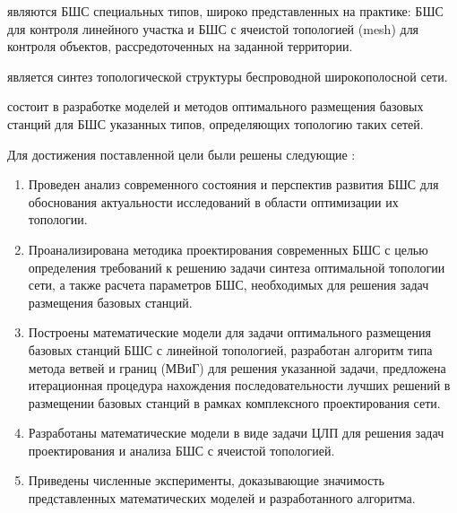 {\objectresearch} являются БШС специальных типов, широко представленных на практике: БШС для контроля линейного участка и БШС с ячеистой топологией (mesh) для контроля объектов, рассредоточенных на заданной территории.

{\subjectresearch} является синтез топологической структуры беспроводной широкополосной сети.

{\aim} состоит в разработке моделей и методов оптимального размещения базовых станций для БШС указанных типов, определяющих топологию таких сетей.

Для достижения поставленной цели были решены следующие {\tasks}:
\begin{enumerate}[beginpenalty=10000] %
  \item Проведен анализ современного состояния и перспектив развития БШС для  обоснования  актуальности исследований в области оптимизации их топологии. 
  \item Проанализирована методика проектирования современных БШС с целью определения требований к решению задачи синтеза оптимальной топологии сети, а также расчета параметров БШС, необходимых для решения задач размещения базовых станций.
  \item Построены математические модели для задачи оптимального размещения базовых станций БШС с линейной топологией, разработан алгоритм типа метода ветвей и границ (МВиГ) для решения указанной задачи, предложена итерационная процедура нахождения последовательности лучших решений в размещении базовых станций в рамках комплексного проектирования сети.
  \item Разработаны математические модели в виде задачи ЦЛП для решения задач проектирования и анализа БШС с ячеистой топологией.
  \item Приведены численные эксперименты, доказывающие значимость представленных математических моделей и разработанного алгоритма.

\end{enumerate}



